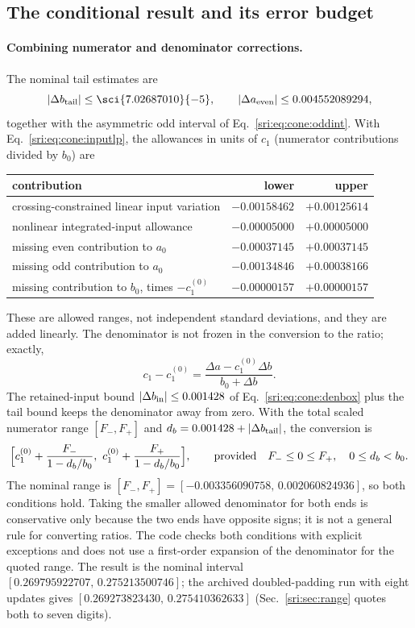 \subsection{The conditional result and its error budget}\label{sri:app:cone:budget}
\paragraph{Combining numerator and denominator corrections.} The nominal tail estimates are
\begin{equation}
 |\Delta b_{\rm tail}|\le\sci{7.02687010}{-5},\qquad |\Delta a_{\rm even}|\le0.004552089294,
\end{equation}
together with the asymmetric odd interval of Eq.~\eqref{sri:eq:cone:oddint}. With Eq.~\eqref{sri:eq:cone:inputlp}, the
allowances in units of $c_1$ (numerator contributions divided by $b_0$) are
\begin{center}\small
\begin{tabular}{@{}lrr@{}}
\toprule
contribution & lower & upper\\
\midrule
crossing-constrained linear input variation & $-0.00158462$ & $+0.00125614$\\
nonlinear integrated-input allowance & $-0.00005000$ & $+0.00005000$\\
missing even contribution to $a_0$ & $-0.00037145$ & $+0.00037145$\\
missing odd contribution to $a_0$ & $-0.00134846$ & $+0.00038166$\\
missing contribution to $b_0$, times $-c_1^{(0)}$ & $-0.00000157$ & $+0.00000157$\\
\bottomrule
\end{tabular}
\end{center}
These are allowed ranges, not independent standard deviations, and they are added linearly. The denominator is not
frozen in the conversion to the ratio; exactly,
\begin{equation}
 c_1-c_1^{(0)}=\frac{\Delta a-c_1^{(0)}\Delta b}{b_0+\Delta b}.
 \label{sri:eq:cone:exactratio}
\end{equation}
The retained-input bound $|\Delta b_{\rm in}|\le0.001428$ of Eq.~\eqref{sri:eq:cone:denbox} plus the tail bound keeps the
denominator away from zero. With the total scaled numerator range $[F_-,F_+]$ and $d_b=0.001428+|\Delta b_{\rm tail}|$,
the conversion is
\begin{equation}
 \Bigl[c_1^{(0)}+\frac{F_-}{1-d_b/b_0},\ c_1^{(0)}+\frac{F_+}{1-d_b/b_0}\Bigr],\qquad\text{provided}\quad
 F_-\le0\le F_+,\quad 0\le d_b<b_0 .
 \label{sri:eq:cone:ratioguard}
\end{equation}
The nominal range is $[F_-,F_+]=[-0.003356090758,\,0.002060824936]$, so both conditions hold. Taking the smaller
allowed denominator for both ends is conservative only because the two ends have opposite signs; it is not a general
rule for converting ratios. The code checks both conditions with explicit exceptions and does not use a first-order
expansion of the denominator for the quoted range. The result is the nominal interval
$[0.269795922707,\,0.275213500746]$; the archived doubled-padding run with eight updates gives
$[0.269273823430,\,0.275410362633]$ (Sec.~\ref{sri:sec:range} quotes both to seven digits).

